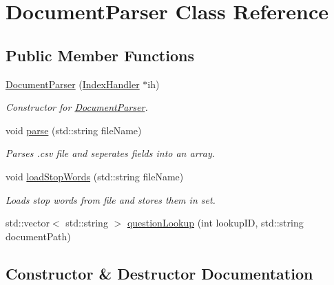 \hypertarget{classDocumentParser}{}\section{Document\+Parser Class Reference}
\label{classDocumentParser}
\subsection*{Public Member Functions}
\begin{DoxyCompactItemize}
\item 
\mbox{\hyperlink{classDocumentParser_aa038283709a41bc286ae70593ece76ee}{Document\+Parser}} (\mbox{\hyperlink{classIndexHandler}{Index\+Handler}} $\ast$ih)
\begin{DoxyCompactList}\small\item\em Constructor for \mbox{\hyperlink{classDocumentParser}{Document\+Parser}}. \end{DoxyCompactList}\item 
void \mbox{\hyperlink{classDocumentParser_aa385067d0e336601c422b6d64c664d39}{parse}} (std\+::string file\+Name)
\begin{DoxyCompactList}\small\item\em Parses .csv file and seperates fields into an array. \end{DoxyCompactList}\item 
void \mbox{\hyperlink{classDocumentParser_ae192e81639f4473998277136b3a821e5}{load\+Stop\+Words}} (std\+::string file\+Name)
\begin{DoxyCompactList}\small\item\em Loads stop words from file and stores them in set. \end{DoxyCompactList}\item 
std\+::vector$<$ std\+::string $>$ \mbox{\hyperlink{classDocumentParser_a957a602ad41470adfc310f9f16d7c5e7}{question\+Lookup}} (int lookup\+ID, std\+::string document\+Path)
\end{DoxyCompactItemize}


\subsection{Constructor \& Destructor Documentation}
\mbox{\label{classDocumentParser_aa038283709a41bc286ae70593ece76ee}} 
